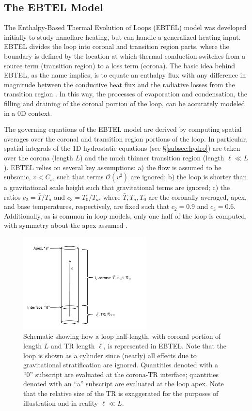 \subsection{The EBTEL Model}
\label{subsec:ebtel}
%
\par The Enthalpy-Based Thermal Evolution of Loops (EBTEL) model \citep{klimchuk_highly_2008,cargill_enthalpy-based_2012} was developed initially to study nanoflare heating, but can handle a generalized heating input. EBTEL divides the loop into coronal and transition region parts, where the boundary is defined by the location at which thermal conduction switches from a source term (transition region) to a loss term (corona). The basic idea behind EBTEL, as the name implies, is to equate an enthalpy flux with any difference in magnitude between the conductive heat flux and the radiative losses from the transition region \citep{klimchuk_highly_2008}. In this way, the processes of evaporation and condensation, the filling and draining of the coronal portion of the loop, can be accurately modeled in a 0D context. 
%
\par The governing equations of the EBTEL model are derived by computing spatial averages over the coronal and transition region portions of the loop. In particular, spatial integrals of the 1D hydrostatic equations (see \S\ref{subsec:hydro}) are taken over the corona (length $L$) and the much thinner transition region (length $\ell\ll L$). EBTEL relies on several key assumptions: a) the flow is assumed to be subsonic, $v<C_s$, such that terms $\mathcal{O}(v^2)$ are ignored; b) the loop is shorter than a gravitational scale height such that gravitational terms are ignored; c) the ratios $c_2=\bar{T}/T_a$ and $c_3=T_0/T_a$, where $\bar{T},T_a,T_0$ are the coronally averaged, apex, and base temperatures, respectively, are fixed such that $c_2=0.9$ and $c_3=0.6$. Additionally, as is common in loop models, only one half of the loop is computed, with symmetry about the apex assumed \citep{klimchuk_highly_2008}.
%
\begin{figure}
	\centering
	\includegraphics[width=0.6\textwidth]{figures/ebtel_schematic.pdf}
	\caption{Schematic showing how a loop half-length, with coronal portion of length $L$ and TR length $\ell$, is represented in EBTEL. Note that the loop is shown as a cylinder since (nearly) all effects due to gravitational stratification are ignored. Quantities denoted with a ``0'' subscript are evaluated at the corona-TR interface; quantities denoted with an ``a'' subscript are evaluated at the loop apex. Note that the relative size of the TR is exaggerated for the purposes of illustration and in reality $\ell\ll L$.}
	\label{fig:ebtel_schematic}
\end{figure}
